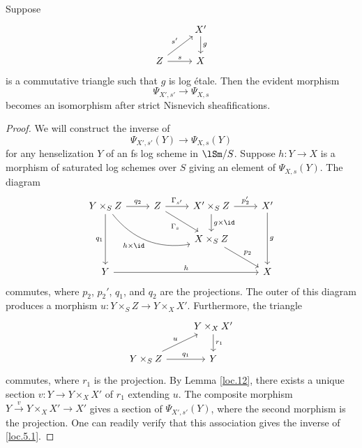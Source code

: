 \documentclass[10pt]{amsart}
\begin{document}
\begin{lem}
\label{loc.5}
Suppose
\[
\begin{tikzcd}
&X'\arrow[d,"g"]\\
Z\arrow[ru,"s'"]\arrow[r,"s"]&X
\end{tikzcd}
\]
is a commutative triangle such that $g$ is log \'etale.
Then the evident morphism
\[
\Psi_{X',s'}\rightarrow \Psi_{X,s}
\]
becomes an isomorphism after strict Nisnevich sheafifications. 
\end{lem}
\begin{proof}
We will construct the inverse of
\begin{equation}
\label{loc.5.1}
\Psi_{X',s'}(Y)\rightarrow \Psi_{X,s}(Y)
\end{equation}
for any henselization $Y$ of an fs log scheme in $\lSm/S$.
Suppose $h\colon Y\to X$ is a morphism of saturated log schemes over $S$ giving an element of $\Psi_{X,s}(Y)$.
The diagram
\[
\begin{tikzcd}
Y\times_S Z\ar[r,"q_2"]\ar[dd,"q_1"']\ar[rrd,"h\times \id"',bend right]&
Z\ar[r,"\Gamma_{s'}"]\ar[rd,"\Gamma_s"']&
X'\times_S Z\ar[r,"p_2'"]\ar[d,"g\times \id"]&
X'\ar[dd,"g"]
\\
&
&
X\times_S Z\ar[rd,"p_2"]
\\
Y\ar[rrr,"h"]&
&
&
X
\end{tikzcd}
\]
commutes, where $p_2$, $p_2'$, $q_1$, and $q_2$ are the projections.
The outer of this diagram produces a morphism $u\colon Y\times_S Z\to Y\times_X X'$.
Furthermore, the triangle
\[
\begin{tikzcd}
&
Y\times_X X'\ar[d,"r_1"]
\\
Y\times_S Z\ar[ru,"u"]\ar[r,"q_1"]&
Y
\end{tikzcd}
\]
commutes, where $r_1$ is the projection.
By Lemma \ref{loc.12}, there exists a unique section $v\colon Y\to Y\times_X X'$ of $r_1$ extending $u$.
The composite morphism $Y\xrightarrow{v} Y\times_X X'\to X'$ gives a section of $\Psi_{X',s'}(Y)$, where the second morphism is the projection.
One can readily verify that this association gives the inverse of \eqref{loc.5.1}.
\end{proof}
\end{document}
